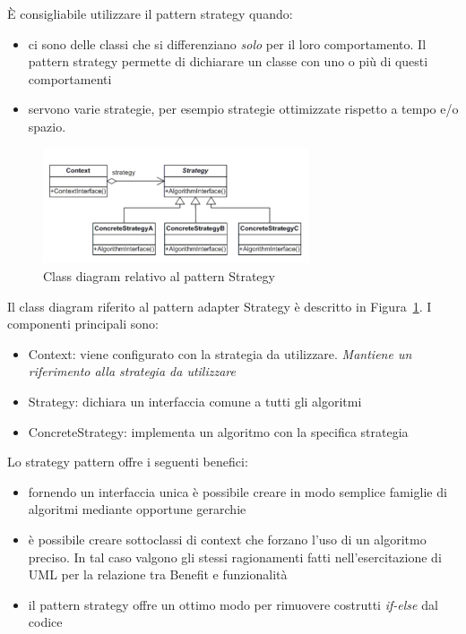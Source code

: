 \documentclass{article}
\begin{document}
\`E consigliabile utilizzare il pattern strategy quando:
\begin{itemize}
\item ci sono delle classi che si differenziano \emph{solo} per il loro comportamento. Il pattern strategy permette di dichiarare un classe con uno o pi\`u di questi comportamenti
\item servono varie strategie, per esempio strategie ottimizzate rispetto a tempo e/o spazio.
\end{itemize}

\begin{figure}[h]
\centering
\includegraphics[width=0.7\textwidth]{Img/Strategy.pdf}
\caption{Class diagram relativo al pattern Strategy}
\label{Fig:StrategyConcepts}
\end{figure}

Il class diagram riferito al pattern adapter Strategy \`e descritto in Figura~\ref{Fig:StrategyConcepts}. I componenti principali sono:
\begin{itemize}
\item Context: viene configurato con la strategia da utilizzare. \emph{Mantiene un riferimento alla strategia da utilizzare}
\item Strategy: dichiara un interfaccia comune a tutti gli algoritmi
\item ConcreteStrategy: implementa un algoritmo con la specifica strategia
\end{itemize}

Lo strategy pattern offre i seguenti benefici:
\begin{itemize}
\item fornendo un interfaccia unica \`e possibile creare in modo semplice famiglie di algoritmi mediante opportune gerarchie
\item \`e possibile creare sottoclassi di context che forzano l'uso di un algoritmo preciso. In tal caso valgono gli stessi ragionamenti fatti nell'esercitazione di UML per la relazione tra Benefit e funzionalit\`a
\item il pattern strategy offre un ottimo modo per rimuovere costrutti \emph{if-else} dal codice 
\end{itemize}
\end{document}

